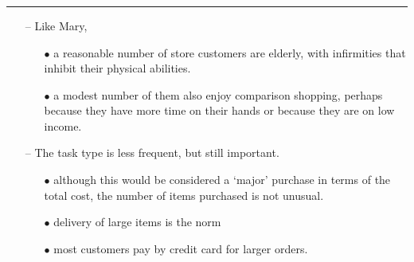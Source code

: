 \documentclass[pdf]{beamer}
\begin{document}
{%
\begin{frame}
\frametitle{\textcolor{myBlue}{\textbf{\hspace{8mm}{Developing task examples: Cheap Shop}}}}
\vspace*{-12mm}
\textcolor{red}{\rule{10cm}{1mm}}

\vspace{3mm}
\textcolor{myBlue}{\textbf{\hspace{2mm}{Discussion}}}
\vspace{2mm}
\begin{itemize}
	\item[\textcolor{myBlue}{--}] \textcolor{myBlue}{{\small Like Mary,}}
		\begin{itemize}
			\item[\textcolor{myBlue}{$\bullet$}]\textcolor{myBlue}{{\footnotesize a reasonable number of store customers are elderly, with infirmities that inhibit their physical abilities. }}
         	\item[\textcolor{myBlue}{$\bullet$}]\textcolor{myBlue}{{\footnotesize a modest number of them also enjoy comparison shopping, perhaps because they have more time on their hands or because they are on low income. }}
		\end{itemize}    
	\vspace{5mm}
	\item[\textcolor{myBlue}{--}] \textcolor{myBlue}{{\small The task type is less frequent, but still important.}}
		\begin{itemize}
       		\item[\textcolor{myBlue}{$\bullet$}]\textcolor{myBlue}{{\footnotesize although this would be considered a ‘major’ purchase in terms of the total cost, the number of items purchased is not unusual.}}
            \item[\textcolor{myBlue}{$\bullet$}]\textcolor{myBlue}{{\footnotesize delivery of large items is the norm }}
            \item[\textcolor{myBlue}{$\bullet$}]\textcolor{myBlue}{{\footnotesize most customers pay by credit card for larger orders. }}
     	\end{itemize}
\end{itemize}
\end{frame}}
\end{document}
